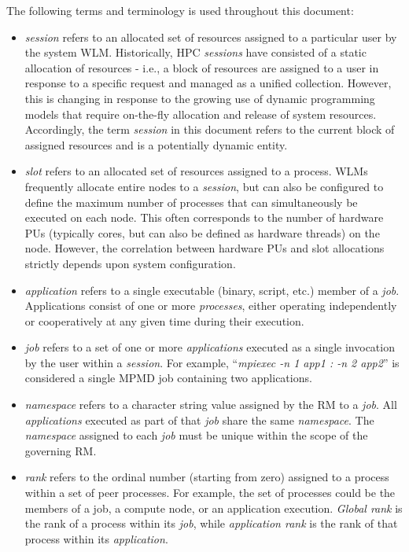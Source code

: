 The following terms and terminology is used throughout this document:
\begin{itemize}
\item {}\emph{session} refers to an allocated set of resources assigned to a particular user by the system \ac{WLM}. Historically, \ac{HPC} \emph{sessions} have consisted of a static allocation of resources - i.e., a block of resources are assigned to a user in response to a specific request and managed as a unified collection. However, this is changing in response to the growing use of dynamic programming models that require on-the-fly allocation and release of system resources. Accordingly, the term \emph{session} in this document refers to the current block of assigned resources and is a potentially dynamic entity.
\item {}\emph{slot} refers to an allocated set of resources assigned to a process. \acp{WLM} frequently allocate entire nodes to a \emph{session}, but can also be configured to define the maximum number of processes that can simultaneously be executed on each node. This often corresponds to the number of hardware \acp{PU} (typically cores, but can also be defined as hardware threads) on the node. However, the correlation between hardware \acp{PU} and slot allocations strictly depends upon system configuration.
\item {}\emph{application} refers to a single executable (binary, script, etc.) member of a \emph{job}. Applications consist of one or more \emph{processes}, either operating independently or cooperatively at any given time during their execution.
\item {}\emph{job} refers to a set of one or more \emph{applications} executed as a single invocation by the user within a \emph{session}. For example, ``\textit{mpiexec -n 1 app1 : -n 2 app2}'' is considered a single \ac{MPMD} job containing two applications.
\item {}\emph{namespace} refers to a character string value assigned by the \ac{RM} to a \textit{job}. All \textit{applications} executed as part of that \textit{job} share the same \emph{namespace}. The \emph{namespace} assigned to each \emph{job} must be unique within the scope of the governing \ac{RM}.
\item {}\emph{rank} refers to the ordinal number (starting from zero) assigned to a process within a set of peer processes.  For example, the set of processes could be the members of a job, a compute node, or an application execution. \emph{Global rank} is the rank of a process within its \emph{job}, while \emph{application rank} is the rank of that process within its \emph{application}.

\end{itemize}
